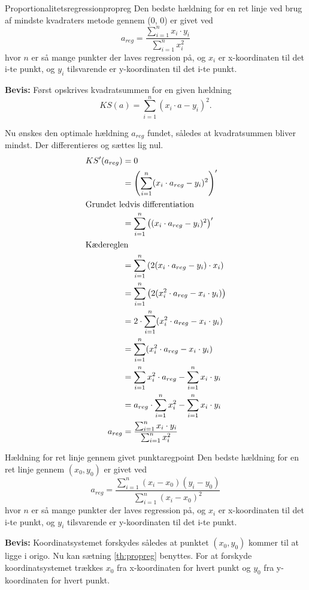\documentclass{article}
\begin{document}
\begin{theorem}{Proportionalitetsregression}{propreg}
	Den bedste hældning for en ret linje ved brug af mindste kvadraters metode
	gennem (0, 0) er givet ved
	\[
	    a_{reg} = \frac{\sum_{i=1}^n x_i \cdot y_i}{\sum_{i=1}^n x_i^2}
	\] 
	hvor $n$ er så mange punkter der laves regression på, og $x_i$ er x-koordinaten
	til det i-te punkt, og $y_i$ tilsvarende er y-koordinaten til det i-te punkt.
\end{theorem}

\textbf{Bevis:}
Først opskrives kvadratsummen for en given hældning
\[
	KS(a) = \sum_{i=1}^n (x_i \cdot a - y_i)^2.
\] 

Nu ønskes den optimale hældning $a_{reg}$ fundet, således at kvadratsummen bliver
mindst. Der differentieres og sættes lig nul.
\begin{align*}
	KS'(a_{reg}) &= 0\\
				 &= \left(\sum_{i=1}^n (x_i \cdot a_{reg} - y_i)^2\right)'\\
\intertext{Grundet ledvis differentiation}
				 &= \sum_{i=1}^n \left((x_i \cdot a_{reg} - y_i)^2\right)'\\
				 \intertext{Kædereglen}
				 &= \sum_{i=1}^n \left(2(x_i \cdot a_{reg} - y_i) \cdot x_i\right)\\
				 &= \sum_{i=1}^n \left(2(x_i^2 \cdot a_{reg} - x_i \cdot y_i)\right)\\
				 &= 2 \cdot \sum_{i=1}^n (x_i^2 \cdot a_{reg} - x_i \cdot y_i)\\
				 &= \sum_{i=1}^n (x_i^2 \cdot a_{reg} - x_i \cdot y_i)\\
				 &= \sum_{i=1}^n x_i^2 \cdot a_{reg} - \sum_{i=1}^n x_i \cdot y_i\\
				 &= a_{reg} \cdot \sum_{i=1}^n x_i^2 - \sum_{i=1}^n x_i \cdot y_i\\
	     a_{reg} &=  \frac{\sum_{i=1}^n x_i \cdot y_i}{\sum_{i=1}^n x_i^2}
\end{align*}

\begin{theorem}{Hældning for ret linje gennem givet punkt}{aregpoint}
	Den bedste hældning for en ret linje gennem $(x_0, y_0)$ er givet ved
	\[
		a_{reg} = \frac{\sum_{i=1}^n (x_i-x_0)(y_i-y_0)}{\sum_{i=1}^n (x_i-x_0)^2}
	\] 
	hvor $n$ er så mange punkter der laves regression på, og $x_i$ er x-koordinaten
	til det i-te punkt, og $y_i$ tilsvarende er y-koordinaten til det i-te punkt.
\end{theorem}

\textbf{Bevis:}
Koordinatsystemet forskydes således at punktet $(x_0, y_0)$ kommer til at ligge
i origo. Nu kan sætning \ref{th:propreg} benyttes. For at forskyde
koordinatsystemet trækkes $x_0$ fra x-koordinaten for hvert punkt og $y_0$ fra
y-koordinaten for hvert punkt.
\end{document}
